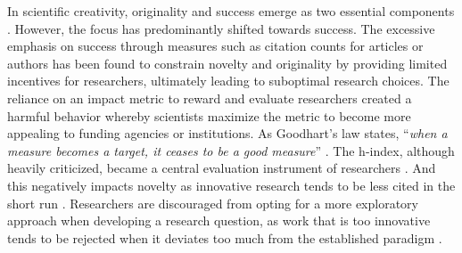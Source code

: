  
In scientific creativity, originality and success emerge as two essential components \citep{runco2012standard}. However, the focus has predominantly shifted towards success. %
The excessive emphasis on success through measures such as citation counts for articles or authors has been found to constrain novelty and originality by providing limited incentives for researchers, ultimately leading to suboptimal research choices.  
The reliance on an impact metric to reward and evaluate researchers created a harmful behavior whereby scientists maximize the metric to become more appealing to funding agencies or institutions. As Goodhart's law states, ``\textit{when a measure becomes a target, it ceases to be a good measure}'' \citep{goodhart1984monetary}. The h-index, although heavily criticized, became a central evaluation instrument of researchers \citep{costas2018reflections}. And this negatively impacts novelty as innovative research tends to be less cited in the short run \citep{wang2017bias}. Researchers are discouraged from opting for a more exploratory approach when developing a research question, as work that is too innovative tends to be rejected when it deviates too much from the established paradigm \citep{carayol2007sequential,trapido2015novelty}. 


